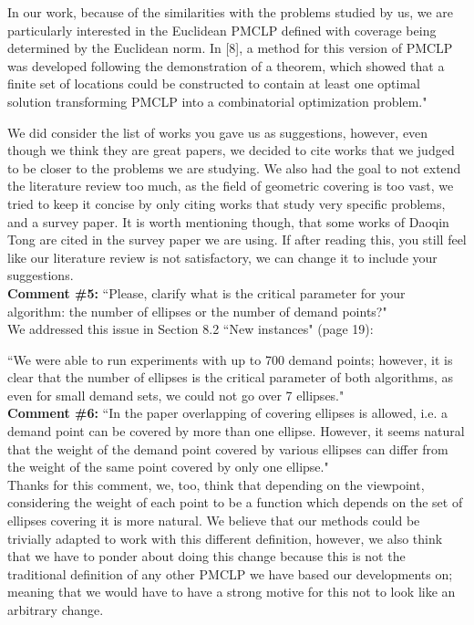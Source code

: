 	In our work, because of the similarities with the problems studied by us, we are particularly interested in the Euclidean PMCLP defined with coverage being determined by the Euclidean norm.	In [8], a method for this version of PMCLP was developed following the demonstration of a theorem,	which showed that a finite set of locations could be constructed to contain at least one optimal	solution transforming PMCLP into a combinatorial optimization problem."
	
	We did consider the list of works you gave us as suggestions, however, even though we think they are great papers, we decided to cite works that we judged to be closer to the problems we are studying. We also had the goal to not extend the literature review too much, as the field of geometric covering is too vast, we tried to keep it concise by only citing works that study very specific problems, and a survey paper.
	It is worth mentioning though, that some works of Daoqin Tong are cited in the survey paper we are using. If after reading this, you still feel like our literature review is not satisfactory, we can change it to include your suggestions.
\\
	
		\textbf{Comment \#5:} ``Please, clarify what is the critical parameter for your algorithm: the number of ellipses or the number of demand points?"
		\\
		
		We addressed this issue in Section 8.2 ``New instances" (page 19):
		
		``We were able to run experiments with up to 700 demand points; however, it is clear that the number of ellipses is the critical parameter of both algorithms, as even for small demand sets, we could not go over 7 ellipses."
		\\
		
		\textbf{Comment \#6:} ``In the paper overlapping of covering ellipses is allowed, i.e. a demand point can be covered by more than one ellipse. However, it seems natural that the weight of the demand point covered by various ellipses can differ from the weight of the same point covered by only one ellipse."
		\\
		
		Thanks for this comment, we, too, think that depending on the viewpoint, considering the weight of each point to be a function which depends on the set of ellipses covering it is more natural. We believe that our methods could be trivially adapted to work with this different definition, however, we also think that we have to ponder about doing this change because this is not the traditional definition of any other PMCLP we have based our developments on; meaning that we would have to have a strong motive for this not to look like an arbitrary change.
		\\	
		
